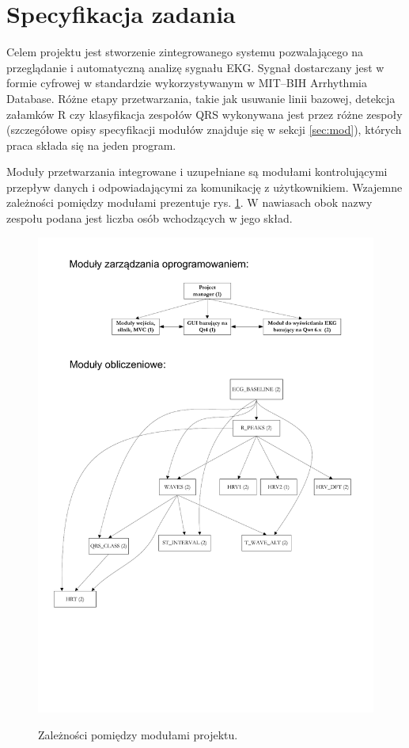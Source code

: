 \documentclass[a4paper, 11pt]{article}
\begin{document}
\setcounter{page}{2}
\tableofcontents
\newpage

\section{Specyfikacja zadania}

Celem projektu jest stworzenie zintegrowanego systemu pozwalającego na przeglądanie i automatyczną analizę sygnału EKG. Sygnał dostarczany jest w formie cyfrowej w standardzie wykorzystywanym w MIT–BIH Arrhythmia Database. Różne etapy przetwarzania, takie jak usuwanie linii bazowej, detekcja załamków R czy klasyfikacja zespołów QRS wykonywana jest przez różne zespoły (szczegółowe opisy specyfikacji modułów znajduje się w sekcji \ref{sec:mod}), których praca składa się na jeden program.

Moduły przetwarzania integrowane i uzupełniane są modułami kontrolującymi przepływ danych i odpowiadającymi za komunikację z użytkownikiem. Wzajemne zależności pomiędzy modułami prezentuje rys. \ref{fig:zaleznosci}. W nawiasach obok nazwy zespołu podana jest liczba osób wchodzących w jego skład.

\begin{figure}[h!]
  \centering
  \includegraphics[width=0.7\linewidth]{include/Projekt_zaleznosci}
  \label{fig:zaleznosci}
  \caption{Zależności pomiędzy modułami projektu.}
\end{figure}
\end{document}
